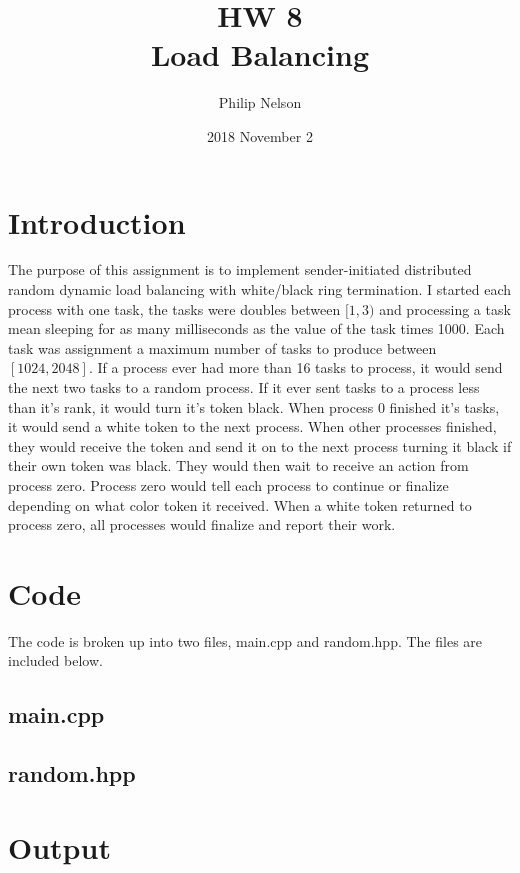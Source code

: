 \documentclass{article}
\title{HW 8 \\ Load Balancing}
\author{Philip Nelson}
\date{2018 November 2}
\begin{document}
\maketitle

\section*{Introduction}

The purpose of this assignment is to implement sender-initiated distributed random dynamic load balancing with white/black ring termination. I started each process with one task, the tasks were doubles between $[1, 3)$ and processing a task mean sleeping for as many milliseconds as the value of the task times 1000. Each task was assignment a maximum number of tasks to produce between $[1024, 2048]$. If a process ever had more than 16 tasks to process, it would send the next two tasks to a random process. If it ever sent tasks to a process less than it's rank, it would turn it's token black. When process 0 finished it's tasks, it would send a white token to the next process. When other processes finished, they would receive the token and send it on to the next process turning it black if their own token was black. They would then wait to receive an action from process zero. Process zero would tell each process to continue or finalize depending on what color token it received. When a white token returned to process zero, all processes would finalize and report their work.

\section*{Code}
The code is broken up into two files, main.cpp and random.hpp. The files are included below.

\bigskip

\subsection{main.cpp}


\subsection{random.hpp}


\newpage

\section*{Output}
\end{document}
